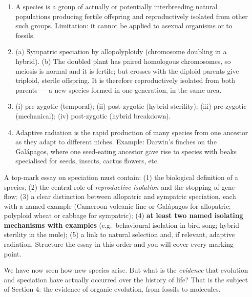 \documentclass[11pt]{article}
\begin{document}
\begin{corrige}[Exercise 1]
\begin{enumerate}
\item A species is a group of actually or potentially interbreeding natural populations producing fertile offspring and reproductively isolated from other such groups. Limitation: it cannot be applied to asexual organisms or to fossils.
\item (a) Sympatric speciation by allopolyploidy (chromosome doubling in a hybrid). (b) The doubled plant has paired homologous chromosomes, so meiosis is normal and it is fertile; but crosses with the diploid parents give triploid, sterile offspring. It is therefore reproductively isolated from both parents --- a new species formed in one generation, in the same area.
\item (i) pre-zygotic (temporal); (ii) post-zygotic (hybrid sterility); (iii) pre-zygotic (mechanical); (iv) post-zygotic (hybrid breakdown).
\item Adaptive radiation is the rapid production of many species from one ancestor as they adapt to different niches. Example: Darwin's finches on the Gal\'apagos, where one seed-eating ancestor gave rise to species with beaks specialised for seeds, insects, cactus flowers, etc.
\end{enumerate}
\end{corrige}

\begin{aretenir}
A top-mark essay on speciation must contain: (1) the biological definition of a species; (2) the central role of \emph{reproductive isolation} and the stopping of gene flow; (3) a clear distinction between allopatric and sympatric speciation, each with a named example (Cameroon volcanic line or Gal\'apagos for allopatric; polyploid wheat or cabbage for sympatric); (4) \textbf{at least two named isolating mechanisms with examples} (e.g.\ behavioural isolation in bird song; hybrid sterility in the mule); (5) a link to natural selection and, if relevant, adaptive radiation. Structure the essay in this order and you will cover every marking point.
\end{aretenir}

We have now seen how new species arise. But what is the \emph{evidence} that evolution and speciation have actually occurred over the history of life? That is the subject of Section 4: the evidence of organic evolution, from fossils to molecules.
\end{document}
